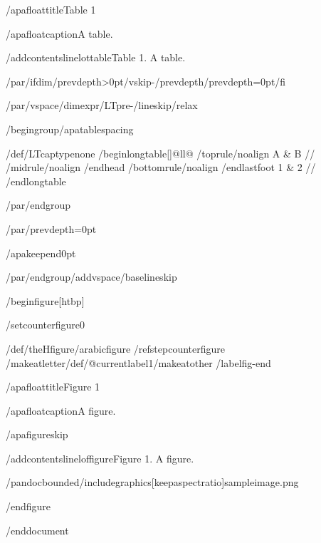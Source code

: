 /apafloattitle{Table 1}

/apafloatcaption{A table.}

/addcontentsline{lot}{table}{Table 1. A table.}

/par/ifdim/prevdepth>0pt/vskip-/prevdepth/prevdepth=0pt/fi

/par/vspace{/dimexpr/LTpre-/lineskip/relax}

/begingroup/apatablespacing

{/def/LTcaptype{none} %
/begin{longtable}[]{@{}ll@{}}
/toprule/noalign{}
A & B //
/midrule/noalign{}
/endhead
/bottomrule/noalign{}
/endlastfoot
1 & 2 //
/end{longtable}
}

/par/endgroup

/par/prevdepth=0pt

/apakeepend{0pt}

/par/endgroup/addvspace{/baselineskip}

/begin{figure}[htbp]

/setcounter{figure}{0}

/def/theHfigure{/arabic{figure}}%
/refstepcounter{figure}%
/makeatletter/def/@currentlabel{1}/makeatother%
/label{fig-end}

/apafloattitle{Figure 1}

/apafloatcaption{A figure.}

/apafigureskip

/addcontentsline{lof}{figure}{Figure 1. A figure.}

/pandocbounded{/includegraphics[keepaspectratio]{sampleimage.png}}

/end{figure}




/end{document}
